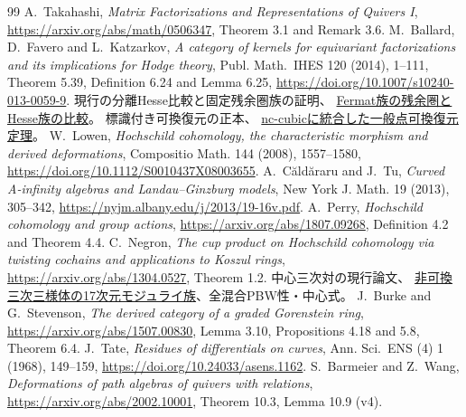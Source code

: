 \documentclass[11pt,a4paper]{ltjsarticle}
\begin{document}
\begin{thebibliography}{99}
 A.~Takahashi, \emph{Matrix Factorizations and Representations of Quivers I},
\url{https://arxiv.org/abs/math/0506347}, Theorem 3.1 and Remark 3.6.
 M.~Ballard, D.~Favero and L.~Katzarkov,
\emph{A category of kernels for equivariant factorizations and its implications for Hodge theory},
Publ. Math.\ IHES 120 (2014), 1--111, Theorem 5.39, Definition 6.24 and Lemma 6.25,
\url{https://doi.org/10.1007/s10240-013-0059-9}.
 現行の分離Hesse比較と固定残余圏族の証明、
\href{https://github.com/uedakazushi/nc-cubic2/blob/main/papers/sections/pfaffian_formal_deformations_gluing.tex}
{Fermat族の残余圏とHesse族の比較}。
 標識付き可換復元の正本、
\href{https://github.com/uedakazushi/nc-cubic/blob/main/papers/sections/generic_recovery/main_result.tex}{nc-cubicに統合した一般点可換復元定理}。
 W.~Lowen, \emph{Hochschild cohomology, the characteristic morphism and derived deformations},
Compositio Math. 144 (2008), 1557--1580,
\url{https://doi.org/10.1112/S0010437X08003655}.
 A.~C\u{a}ld\u{a}raru and J.~Tu, \emph{Curved A-infinity algebras and Landau--Ginzburg models},
New York J. Math. 19 (2013), 305--342, \url{https://nyjm.albany.edu/j/2013/19-16v.pdf}.
 A.~Perry, \emph{Hochschild cohomology and group actions},
\url{https://arxiv.org/abs/1807.09268}, Definition 4.2 and Theorem 4.4.
 C.~Negron, \emph{The cup product on Hochschild cohomology via twisting cochains
and applications to Koszul rings}, \url{https://arxiv.org/abs/1304.0527}, Theorem 1.2.
 中心三次対の現行論文、
\href{https://github.com/uedakazushi/nc-cubic-classification/blob/main/papers/nc_cubic_threefold_moduli.tex}
{非可換三次三様体の17次元モジュライ族}、全混合PBW性・中心式。
 J.~Burke and G.~Stevenson, \emph{The derived category of a graded Gorenstein ring},
\url{https://arxiv.org/abs/1507.00830}, Lemma 3.10, Propositions 4.18 and 5.8, Theorem 6.4.
 J.~Tate, \emph{Residues of differentials on curves}, Ann. Sci.\ ENS (4) 1 (1968), 149--159,
\url{https://doi.org/10.24033/asens.1162}.
 S.~Barmeier and Z.~Wang, \emph{Deformations of path algebras of quivers with relations}, \url{https://arxiv.org/abs/2002.10001},
Theorem 10.3, Lemma 10.9 (v4).
\end{thebibliography}
\end{document}
